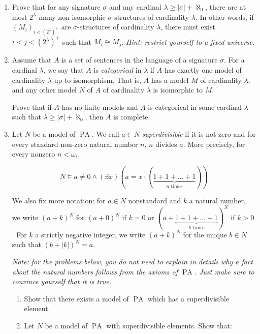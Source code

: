 \documentclass{amsart}
\theoremstyle{definition}
\newcommand{\PA}{\operatorname{PA}}
\begin{document}
\begin{enumerate}
\item Prove that for any signature $\sigma$ and any cardinal $\lambda \ge |\sigma| + \aleph_0$, there are at most $2^{\lambda}$-many non-isomorphic $\sigma$-structures of cardinality $\lambda$. In other words, if $(M_i)_{i < \left(2^\lambda\right)^+}$ are $\sigma$-structures of cardinality $\lambda$, there must exist $i < j < \left(2^{\lambda}\right)^+$ such that $M_i \cong M_j$. \emph{Hint: restrict yourself to a fixed universe.}
\item Assume that $A$ is a set of sentences in the language of a signature $\sigma$. For a cardinal $\lambda$, we say that $A$ is \emph{categorical} in $\lambda$ if $A$ has exactly one model of cardinality $\lambda$ up to isomorphism. That is, $A$ has a model $M$ of cardinality $\lambda$, and any other model $N$ of $A$ of cardinality $\lambda$ is isomorphic to $M$.

  Prove that if $A$ has no finite models and $A$ is categorical in some cardinal $\lambda$ such that $\lambda \ge |\sigma| + \aleph_0$, then $A$ is complete.
\item Let $N$ be a model of $\PA$. We call $a \in N$ \emph{superdivisible} if it is not zero and for every standard non-zero natural number $n$, $n$ divides $a$. More precisely, for every nonzero $n < \omega$,

  $$
  N\models a \neq 0 \land (\exists x)( a = x \cdot (\underbrace{1 + 1 + \ldots + 1}_{n \text{ times}}))
  $$

  We also fix more notation: for $a \in N$ nonstandard and $k$ a natural number, we write $(a + k)^N$ for $(a + 0)^N$ if $k = 0$ or $(a + \underbrace{1 + 1 + \ldots + 1}_{k \text{ times}})^N$ if $k > 0$. For $k$ a strictly negative integer, we write $(a + k)^N$ for the unique $b \in N$ such that $(b + |k|)^N = a$.

  \emph{Note: for the problems below, you do not need to explain in details why a fact about the natural numbers follows from the axioms of $\PA$. Just make sure to convince yourself that it is true.}

  \begin{enumerate}
  \item Show that there exists a model of $\PA$ which has a superdivisible element.
  \item Let $N$ be a model of $\PA$ with superdivisible elements. Show that:


\end{enumerate}
\end{enumerate}
\end{document}
